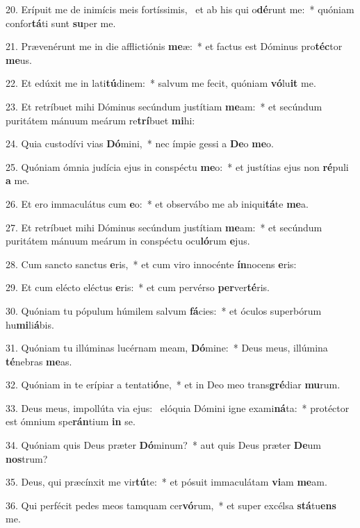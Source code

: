 20. Erípuit me de inimícis meis fortíssimis, \dag\  et ab his qui o\textbf{dé}runt me:~*  quóniam confor\textbf{tá}ti sunt \textbf{su}per me.\

21. Prævenérunt me in die afflictiónis \textbf{me}æ:~*  et factus est Dóminus pro\textbf{téc}tor \textbf{me}us.\

22. Et edúxit me in lati\textbf{tú}dinem:~*  salvum me fecit, quóniam \textbf{vó}lu\textbf{it} me.\

23. Et retríbuet mihi Dóminus secúndum justítiam \textbf{me}am:~*  et secúndum puritátem mánuum meárum re\textbf{trí}buet \textbf{mi}hi:\

24. Quia custodívi vias \textbf{Dó}mini,~*  nec ímpie gessi a \textbf{De}o \textbf{me}o.\

25. Quóniam ómnia judícia ejus in conspéctu \textbf{me}o:~*  et justítias ejus non \textbf{ré}puli \textbf{a} me.\

26. Et ero immaculátus cum \textbf{e}o:~*  et observábo me ab iniqui\textbf{tá}te \textbf{me}a.\

27. Et retríbuet mihi Dóminus secúndum justítiam \textbf{me}am:~*  et secúndum puritátem mánuum meárum in conspéctu ocu\textbf{ló}rum \textbf{e}jus.\

28. Cum sancto sanctus \textbf{e}ris,~*  et cum viro innocénte \textbf{ín}nocens \textbf{e}ris:\

29. Et cum elécto eléctus \textbf{e}ris:~*  et cum pervérso \textbf{per}ver\textbf{té}ris.\

30. Quóniam tu pópulum húmilem salvum \textbf{fá}cies:~*  et óculos superbórum hu\textbf{mi}li\textbf{á}bis.\

31. Quóniam tu illúminas lucérnam meam, \textbf{Dó}mine:~*  Deus meus, illúmina \textbf{té}nebras \textbf{me}as.\

32. Quóniam in te erípiar a tentati\textbf{ó}ne,~*  et in Deo meo trans\textbf{gré}diar \textbf{mu}rum.\

33. Deus meus, impollúta via ejus: \dag\  elóquia Dómini igne exami\textbf{ná}ta:~*  protéctor est ómnium spe\textbf{rán}tium \textbf{in} se.\

34. Quóniam quis Deus præter \textbf{Dó}minum?~*  aut quis Deus præter \textbf{De}um \textbf{nos}trum?\

35. Deus, qui præcínxit me vir\textbf{tú}te:~*  et pósuit immaculátam \textbf{vi}am \textbf{me}am.\

36. Qui perfécit pedes meos tamquam cer\textbf{vó}rum,~*  et super excélsa \textbf{stá}tu\textbf{ens} me.\

